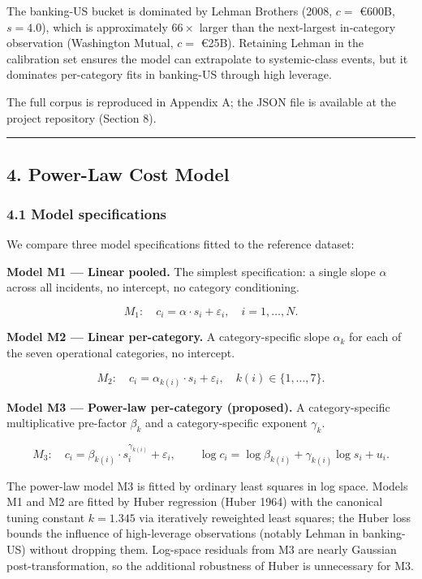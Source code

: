 \documentclass[
]{article}
\begin{document}
The banking-US bucket is dominated by Lehman Brothers (2008, \(c =\)
€600B, \(s = 4.0\)), which is approximately \(66\times\) larger than the
next-largest in-category observation (Washington Mutual, \(c =\) €25B).
Retaining Lehman in the calibration set ensures the model can
extrapolate to systemic-class events, but it dominates per-category fits
in banking-US through high leverage.

The full corpus is reproduced in Appendix A; the JSON file is available
at the project repository (Section 8).

\begin{center}\rule{0.5\linewidth}{0.5pt}\end{center}

\subsection{4. Power-Law Cost Model}\label{power-law-cost-model}

\subsubsection{4.1 Model specifications}\label{model-specifications}

We compare three model specifications fitted to the reference dataset:

\textbf{Model M1 --- Linear pooled.} The simplest specification: a
single slope \(\alpha\) across all incidents, no intercept, no category
conditioning.

\[
M_1: \quad c_i = \alpha \cdot s_i + \varepsilon_i, \quad i = 1, \ldots, N.
\]

\textbf{Model M2 --- Linear per-category.} A category-specific slope
\(\alpha_k\) for each of the seven operational categories, no intercept.

\[
M_2: \quad c_i = \alpha_{k(i)} \cdot s_i + \varepsilon_i, \quad k(i) \in \{1, \ldots, 7\}.
\]

\textbf{Model M3 --- Power-law per-category (proposed).} A
category-specific multiplicative pre-factor \(\beta_k\) and a
category-specific exponent \(\gamma_k\).

\[
M_3: \quad c_i = \beta_{k(i)} \cdot s_i^{\gamma_{k(i)}} + \varepsilon_i,
\qquad \log c_i = \log \beta_{k(i)} + \gamma_{k(i)} \log s_i + u_i.
\]

The power-law model M3 is fitted by ordinary least squares in log space.
Models M1 and M2 are fitted by Huber regression (Huber 1964) with the
canonical tuning constant \(k = 1.345\) via iteratively reweighted least
squares; the Huber loss bounds the influence of high-leverage
observations (notably Lehman in banking-US) without dropping them.
Log-space residuals from M3 are nearly Gaussian post-transformation, so
the additional robustness of Huber is unnecessary for M3.
\end{document}
